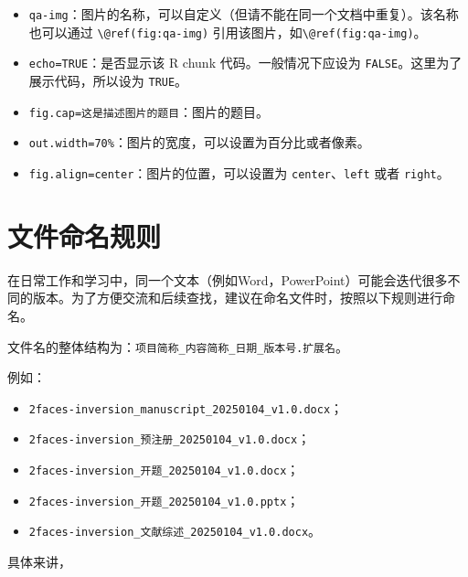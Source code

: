 \documentclass[]{ctexbook}
\providecommand{\tightlist}{%
  \setlength{\itemsep}{0pt}\setlength{\parskip}{0pt}}
\theoremstyle{definition}
\theoremstyle{definition}
\theoremstyle{definition}
\theoremstyle{definition}
\theoremstyle{remark}
\begin{document}
\begin{itemize}
\tightlist
\item
  \texttt{qa-img}：图片的名称，可以自定义（但请不能在同一个文档中重复）。该名称也可以通过 \texttt{\textbackslash{}@ref(fig:qa-img)} 引用该图片，如\texttt{\textbackslash{}@ref(fig:qa-img)}。
\item
  \texttt{echo=TRUE}：是否显示该 R chunk 代码。一般情况下应设为 \texttt{FALSE}。这里为了展示代码，所以设为 \texttt{TRUE}。
\item
  \texttt{fig.cap=\textquotesingle{}这是描述图片的题目\textquotesingle{}}：图片的题目。
\item
  \texttt{out.width=\textquotesingle{}70\%\textquotesingle{}}：图片的宽度，可以设置为百分比或者像素。
\item
  \texttt{fig.align=\textquotesingle{}center\textquotesingle{}}：图片的位置，可以设置为 \texttt{center}、\texttt{left} 或者 \texttt{right}。
\end{itemize}

\chapter{文件命名规则}\label{ux6587ux4ef6ux547dux540dux89c4ux5219}

在日常工作和学习中，同一个文本（例如Word，PowerPoint）可能会迭代很多不同的版本。为了方便交流和后续查找，建议在命名文件时，按照以下规则进行命名。

文件名的整体结构为：\texttt{项目简称\_内容简称\_日期\_版本号.扩展名}。

例如：

\begin{itemize}
\tightlist
\item
  \texttt{2faces-inversion\_manuscript\_20250104\_v1.0.docx}；\\
\item
  \texttt{2faces-inversion\_预注册\_20250104\_v1.0.docx}；\\
\item
  \texttt{2faces-inversion\_开题\_20250104\_v1.0.docx}；\\
\item
  \texttt{2faces-inversion\_开题\_20250104\_v1.0.pptx}；\\
\item
  \texttt{2faces-inversion\_文献综述\_20250104\_v1.0.docx}。
\end{itemize}

具体来讲，
\end{document}
